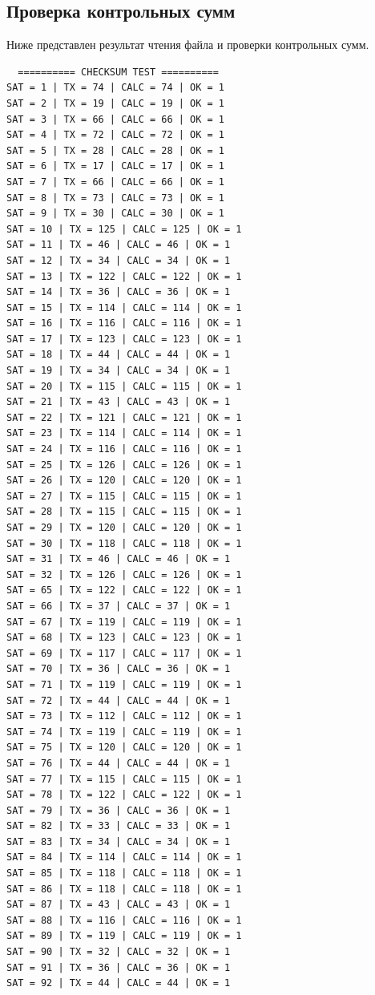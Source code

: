 \documentclass[a4paper, 14pt]{article}
\begin{document}
\subsection{Проверка контрольных сумм}

Ниже представлен результат чтения файла и проверки контрольных сумм.

\begin{center}

\begin{verbatim}
  ========== CHECKSUM TEST ==========
SAT = 1 | TX = 74 | CALC = 74 | OK = 1
SAT = 2 | TX = 19 | CALC = 19 | OK = 1
SAT = 3 | TX = 66 | CALC = 66 | OK = 1
SAT = 4 | TX = 72 | CALC = 72 | OK = 1
SAT = 5 | TX = 28 | CALC = 28 | OK = 1
SAT = 6 | TX = 17 | CALC = 17 | OK = 1
SAT = 7 | TX = 66 | CALC = 66 | OK = 1
SAT = 8 | TX = 73 | CALC = 73 | OK = 1
SAT = 9 | TX = 30 | CALC = 30 | OK = 1
SAT = 10 | TX = 125 | CALC = 125 | OK = 1
SAT = 11 | TX = 46 | CALC = 46 | OK = 1
SAT = 12 | TX = 34 | CALC = 34 | OK = 1
SAT = 13 | TX = 122 | CALC = 122 | OK = 1
SAT = 14 | TX = 36 | CALC = 36 | OK = 1
SAT = 15 | TX = 114 | CALC = 114 | OK = 1
SAT = 16 | TX = 116 | CALC = 116 | OK = 1
SAT = 17 | TX = 123 | CALC = 123 | OK = 1
SAT = 18 | TX = 44 | CALC = 44 | OK = 1
SAT = 19 | TX = 34 | CALC = 34 | OK = 1
SAT = 20 | TX = 115 | CALC = 115 | OK = 1
SAT = 21 | TX = 43 | CALC = 43 | OK = 1
SAT = 22 | TX = 121 | CALC = 121 | OK = 1
SAT = 23 | TX = 114 | CALC = 114 | OK = 1
SAT = 24 | TX = 116 | CALC = 116 | OK = 1
SAT = 25 | TX = 126 | CALC = 126 | OK = 1
SAT = 26 | TX = 120 | CALC = 120 | OK = 1
SAT = 27 | TX = 115 | CALC = 115 | OK = 1
SAT = 28 | TX = 115 | CALC = 115 | OK = 1
SAT = 29 | TX = 120 | CALC = 120 | OK = 1
SAT = 30 | TX = 118 | CALC = 118 | OK = 1
SAT = 31 | TX = 46 | CALC = 46 | OK = 1
SAT = 32 | TX = 126 | CALC = 126 | OK = 1
SAT = 65 | TX = 122 | CALC = 122 | OK = 1
SAT = 66 | TX = 37 | CALC = 37 | OK = 1
SAT = 67 | TX = 119 | CALC = 119 | OK = 1
SAT = 68 | TX = 123 | CALC = 123 | OK = 1
SAT = 69 | TX = 117 | CALC = 117 | OK = 1
SAT = 70 | TX = 36 | CALC = 36 | OK = 1
SAT = 71 | TX = 119 | CALC = 119 | OK = 1
SAT = 72 | TX = 44 | CALC = 44 | OK = 1
SAT = 73 | TX = 112 | CALC = 112 | OK = 1
SAT = 74 | TX = 119 | CALC = 119 | OK = 1
SAT = 75 | TX = 120 | CALC = 120 | OK = 1
SAT = 76 | TX = 44 | CALC = 44 | OK = 1
SAT = 77 | TX = 115 | CALC = 115 | OK = 1
SAT = 78 | TX = 122 | CALC = 122 | OK = 1
SAT = 79 | TX = 36 | CALC = 36 | OK = 1
SAT = 82 | TX = 33 | CALC = 33 | OK = 1
SAT = 83 | TX = 34 | CALC = 34 | OK = 1
SAT = 84 | TX = 114 | CALC = 114 | OK = 1
SAT = 85 | TX = 118 | CALC = 118 | OK = 1
SAT = 86 | TX = 118 | CALC = 118 | OK = 1
SAT = 87 | TX = 43 | CALC = 43 | OK = 1
SAT = 88 | TX = 116 | CALC = 116 | OK = 1
SAT = 89 | TX = 119 | CALC = 119 | OK = 1
SAT = 90 | TX = 32 | CALC = 32 | OK = 1
SAT = 91 | TX = 36 | CALC = 36 | OK = 1
SAT = 92 | TX = 44 | CALC = 44 | OK = 1
\end{verbatim}
\end{center}
\end{document}
